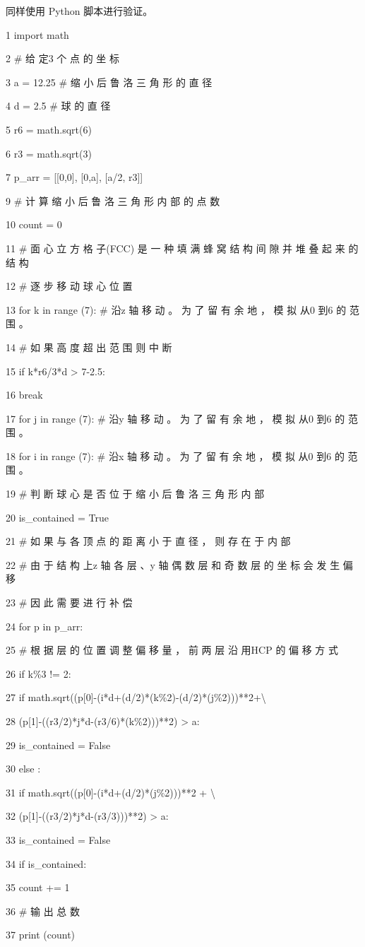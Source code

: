 同样使用 Python 脚本进行验证。\par
1 import math\par
2 \# 给 定3 个 点 的 坐 标\par
3 a = 12.25 \# 缩 小 后 鲁 洛 三 角 形 的 直 径\par
4 d = 2.5 \# 球 的 直 径\par
5 r6 = math.sqrt(6)\par
6 r3 = math.sqrt(3)\par
7 p\_arr = [[0,0], [0,a], [a/2, r3]]\par
9 \# 计 算 缩 小 后 鲁 洛 三 角 形 内 部 的 点 数\par
10 count = 0\par
11 \# 面 心 立 方 格 子(FCC) 是 一 种 填 满 蜂 窝 结 构 间 隙 并 堆 叠 起 来 的 结 构\par
12 \# 逐 步 移 动 球 心 位 置\par
13 for k in range (7): \# 沿z 轴 移 动 。 为 了 留 有 余 地 ， 模 拟 从0 到6 的 范 围 。\par
14 \# 如 果 高 度 超 出 范 围 则 中 断\par
15 if k*r6/3*d > 7-2.5:\par
16 break\par
17 for j in range (7): \# 沿y 轴 移 动 。 为 了 留 有 余 地 ， 模 拟 从0 到6 的 范 围 。\par
18 for i in range (7): \# 沿x 轴 移 动 。 为 了 留 有 余 地 ， 模 拟 从0 到6 的 范 围 。\par
19 \# 判 断 球 心 是 否 位 于 缩 小 后 鲁 洛 三 角 形 内 部\par
20 is\_contained = True\par
21 \# 如 果 与 各 顶 点 的 距 离 小 于 直 径 ， 则 存 在 于 内 部\par
22 \# 由 于 结 构 上z 轴 各 层 、y 轴 偶 数 层 和 奇 数 层 的 坐 标 会 发 生 偏 移\par
23 \# 因 此 需 要 进 行 补 偿\par
24 for p in p\_arr:\par
25 \# 根 据 层 的 位 置 调 整 偏 移 量 ， 前 两 层 沿 用HCP 的 偏 移 方 式\par
26 if k\%3 != 2:\par
27 if math.sqrt((p[0]-(i*d+(d/2)*(k\%2)-(d/2)*(j\%2)))**2+\textbackslash{}\par
28 (p[1]-((r3/2)*j*d-(r3/6)*(k\%2)))**2) > a:\par
29 is\_contained = False\par
30 else :\par
31 if math.sqrt((p[0]-(i*d+(d/2)*(j\%2)))**2 + \textbackslash{}\par
32 (p[1]-((r3/2)*j*d-(r3/3)))**2) > a:\par
33 is\_contained = False\par
34 if is\_contained:\par
35 count += 1\par
36 \# 输 出 总 数\par
37 print (count)\par

